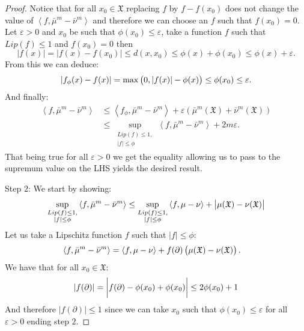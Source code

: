 \documentclass[11pt,a4paper]{article}
\newcommand{\XF}{\mathfrak{X}}
\newcommand{\brac}[1]{\left\langle#1\right\rangle}
\begin{document}
\begin{proof}
    Notice that for all $x_0 \in \XF$ replacing $f$ by $f - f(x_0)$ does not change the value of $\brac{f,\bar{\mu}^m - \bar{\nu}^m}$ and therefore we can choose an $f$ such that $f(x_0) = 0$. Let $\varepsilon > 0$ and $x_0$ be such that $\phi(x_0) \leq \varepsilon$, take a function $f$ such that $Lip(f) \leq 1$ and $f(x_0) = 0$ then 
    \[
    |f(x)| = |f(x) - f(x_0)| \leq d(x,x_0) \leq \phi(x) + \phi(x_0) \leq \phi(x) + \varepsilon.
    \]
    From this we can deduce:
    \[
    |f_\phi(x) - f(x)| = \max\left(0,|f(x)| - \phi(x) \vphantom{A^2}\right) \leq \phi(x_0) \leq \varepsilon.
    \]
    And finally:
    \begin{align*}
        \brac{f,\bar{\mu}^m - \bar{\nu}^m} &\leq \brac{f_\phi,\bar{\mu}^m - \bar{\nu}^m} + \varepsilon\left(\bar{\mu}^m(\XF) + \bar{\nu}^m(\XF)\right)\\
        &\leq \sup\limits_{\substack{Lip(f) \leq 1,\\ |f| \leq \phi}} \brac{f,\bar{\mu}^m - \bar{\nu}^m} + 2m\varepsilon .
    \end{align*}
    That being true for all $\varepsilon > 0$ we get the equality allowing us to pass to the supremum value on the LHS yields the desired result.

    Step $2$: We start by showing:
    \begin{align*}
        \sup\limits_{\substack{Lip(f) \leq 1,\\ |f| \leq \phi}} \brac{f,\bar{\mu}^m - \bar{\nu}^m} \leq \sup\limits_{\substack{Lip(f) \leq 1,\\ |f| \leq \phi}} \brac{f,\mu - \nu} + \left|\vphantom{A^2}\mu(\XF) - \nu(\XF) \right|
    \end{align*}
    Let us take a Lipschitz function $f$ such that $|f| \leq \phi$:
    \begin{align*}
        \brac{f,\bar{\mu}^m - \bar{\nu}^m} &= \brac{f,\mu - \nu} + f(\partial) \left(\mu(\XF) - \nu(\XF)\vphantom{A^2}\right).
    \end{align*}
    We have that for all $x_0 \in \XF$:
    \[
    |f(\partial)| = \left|\vphantom{A^{\int_0}}f(\partial) - \phi(x_0) + \phi(x_0)\right| \leq 2\phi(x_0) + 1
    \]
    And therefore $|f(\partial)| \leq 1$ since we can take $x_0$ such that $\phi(x_0) \leq \varepsilon$ for all $\varepsilon > 0$ ending step $2$.
    

\end{proof}
\end{document}

